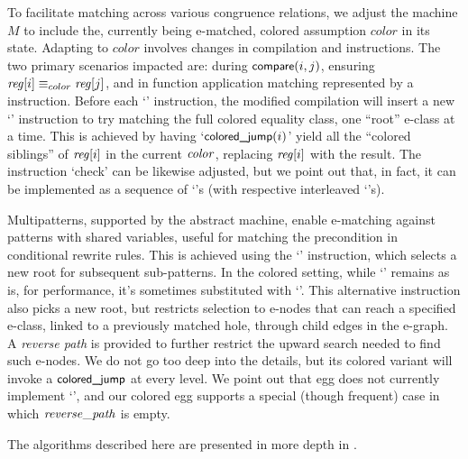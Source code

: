 To facilitate matching across various congruence relations, we adjust the machine $M$ to include the, currently being e-matched, colored assumption $color$ in its state.
Adapting to $color$ involves changes in compilation and instructions. 
The two primary scenarios impacted are: during $\icompare(i, j)$, ensuring $\mathit{reg}[i] \equiv_{color} \mathit{reg}[j]$, and in function application matching represented by a \ibind~ instruction.
Before each `\ibind' instruction, the modified compilation will insert a new `\iclrjmp' instruction to try matching the full colored equality class, one ``root'' e-class at a time.
This is achieved by having `$\iclrjmp(i)$' yield all the ``colored siblings'' of $\mathit{reg}[i]$ in the current $\mathit{color}$, replacing $\mathit{reg}[i]$ with the result.
The instruction `check' can be likewise adjusted, but we point out
that, in fact, it can be implemented as a sequence of `\ibind's (with respective interleaved `\iclrjmp's).

Multipatterns, supported by the abstract machine, enable e-matching against patterns with shared variables, useful for matching the precondition in conditional rewrite rules.
This is achieved using the `\icontinue' instruction, which selects a new root for subsequent sub-patterns. 
In the colored setting, while `\icontinue' remains as is, for performance, it's sometimes substituted with `\ijoin'. 
This alternative instruction also picks a new root, but restricts selection to e-nodes that can reach a specified e-class, linked to a previously matched hole, through child edges in the e-graph.
A \emph{reverse path} is provided to further restrict the upward search needed to find such e-nodes.
We do not go too deep into the details, but its colored variant
will invoke a $\iclrjmp$ at every level.
We point out that egg does not currently implement `\ijoin',
and our colored egg supports a special (though frequent) case in which
$\mathit{reverse\_path}$ is empty.

The algorithms described here are presented in more depth in .